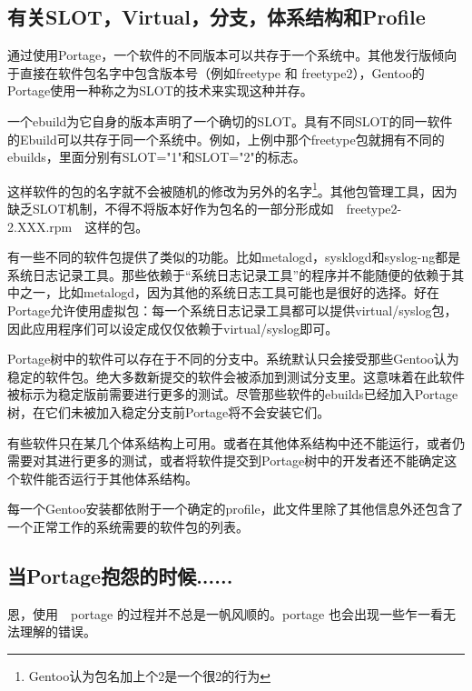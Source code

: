 \subsection{有关SLOT，Virtual，分支，体系结构和Profile\protect\footnotemark{}}

通过使用Portage，一个软件的不同版本可以共存于一个系统中。其他发行版倾向于直接在软件包名字中包含版本号（例如freetype 和 freetype2），Gentoo的Portage使用一种称之为SLOT的技术来实现这种并存。

一个ebuild为它自身的版本声明了一个确切的SLOT。具有不同SLOT的同一软件的Ebuild可以共存于同一个系统中。例如，上例中那个freetype包就拥有不同的ebuilds，里面分别有SLOT="1"和SLOT="2"的标志。

这样软件的包的名字就不会被随机的修改为另外的名字\footnote{Gentoo认为包名加上个2是一个很2的行为}。其他包管理工具，因为缺乏SLOT机制，不得不将版本好作为包名的一部分形成如　freetype2-2.XXX.rpm　这样的包。

有一些不同的软件包提供了类似的功能。比如metalogd，sysklogd和syslog-ng都是系统日志记录工具。那些依赖于“系统日志记录工具”的程序并不能随便的依赖于其中之一，比如metalogd，因为其他的系统日志工具可能也是很好的选择。好在Portage允许使用虚拟包：每一个系统日志记录工具都可以提供virtual/syslog包，因此应用程序们可以设定成仅仅依赖于virtual/syslog即可。

Portage树中的软件可以存在于不同的分支中。系统默认只会接受那些Gentoo认为稳定的软件包。绝大多数新提交的软件会被添加到测试分支里。这意味着在此软件被标示为稳定版前需要进行更多的测试。尽管那些软件的ebuilds已经加入Portage树，在它们未被加入稳定分支前Portage将不会安装它们。

有些软件只在某几个体系结构上可用。或者在其他体系结构中还不能运行，或者仍需要对其进行更多的测试，或者将软件提交到Portage树中的开发者还不能确定这个软件能否运行于其他体系结构。

每一个Gentoo安装都依附于一个确定的profile，此文件里除了其他信息外还包含了一个正常工作的系统需要的软件包的列表。


\subsection{当Portage抱怨的时候......}

恩，使用　portage 的过程并不总是一帆风顺的。portage 也会出现一些乍一看无法理解的错误。

